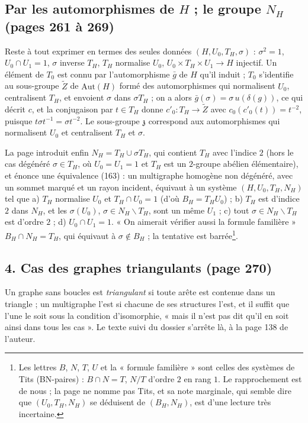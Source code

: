 \documentclass[11pt,a4paper]{article}
\begin{document}
\subsection*{Par les automorphismes de $H$ ; le groupe $N_H$ (pages 261 à 269)}

Reste à tout exprimer en termes des seules données $(H, U_0, T_H, \sigma)$ :
$\sigma^2 = 1$, $U_0 \cap U_1 = 1$, $\sigma$ inverse $T_H$, $T_H$ normalise $U_0$,
$U_0 \times T_H \times U_1 \to H$ injectif. Un élément de $T_0$ est connu par
l'automorphisme $\bar g$ de $H$ qu'il induit ; $T_0$ s'identifie au sous-groupe
$\widetilde{Z}$ de $\mathrm{Aut}(H)$ formé des automorphismes qui normalisent
$U_0$, centralisent $T_H$, et envoient $\sigma$ dans $\sigma T_H$ ; on a alors
$\bar g(\sigma) = \sigma\, u(\delta(g))$, ce qui décrit $c$, et la conjugaison par
$t \in T_H$ donne $c'_0 : T_H \to \widetilde{Z}$ avec $c_0(c'_0(t)) = t^{-2}$,
puisque $t\sigma t^{-1} = \sigma t^{-2}$. Le sous-groupe $\mathfrak{z}$
correspond aux automorphismes qui normalisent $U_0$ et centralisent $T_H$ et
$\sigma$.

La page introduit enfin $N_H = T_H \cup \sigma T_H$, qui contient $T_H$ avec
l'indice $2$ (hors le cas dégénéré $\sigma \in T_H$, où $U_0 = U_1 = 1$ et $T_H$
est un $2$-groupe abélien élémentaire), et énonce une équivalence (163) : un
multigraphe homogène non dégénéré, avec un sommet marqué et un rayon incident,
équivaut à un système $(H, U_0, T_H, N_H)$ tel que a) $T_H$ normalise $U_0$ et
$T_H \cap U_0 = 1$ (d'où $B_H = T_H U_0$) ; b) $T_H$ est d'indice $2$ dans
$N_H$, et les $\sigma(U_0)$, $\sigma \in N_H \smallsetminus T_H$, sont un même
$U_1$ ; c) tout $\sigma \in N_H \smallsetminus T_H$ est d'ordre $2$ ; d) $U_0
\cap U_1 = 1$. « On aimerait vérifier aussi la formule familière » $B_H \cap N_H =
T_H$, qui équivaut à $\sigma \notin B_H$ ; la tentative est barrée\footnote{Les
lettres $B$, $N$, $T$, $U$ et la « formule familière » sont celles des systèmes
de Tits (BN-paires) : $B \cap N = T$, $N/T$ d'ordre $2$ en rang $1$. Le
rapprochement est de nous ; la page ne nomme pas Tits, et sa note marginale, qui
semble dire que $(U_0, T_H, N_H)$ se déduisent de $(B_H, N_H)$, est d'une
lecture très incertaine.}.

\subsection*{4. Cas des graphes triangulants (page 270)}

Un graphe sans boucles est \emph{triangulant} si toute arête est contenue dans
un triangle ; un multigraphe l'est si chacune de ses structures l'est, et il
suffit que l'une le soit sous la condition d'isomorphie, « mais il n'est pas dit
qu'il en soit ainsi dans tous les cas ». Le texte suivi du dossier s'arrête là,
à la page 138 de l'auteur.
\end{document}

